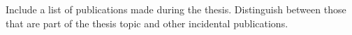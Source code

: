Include a list of publications made during the thesis.
Distinguish between those that are part of the thesis topic
and other incidental publications.
